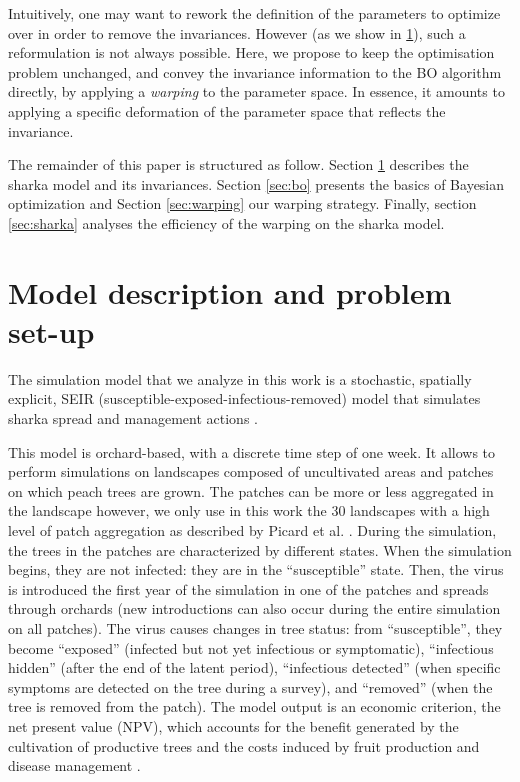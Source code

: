 Intuitively, one may want to rework the definition of the parameters to optimize over in order
to remove the invariances. However (as we show in \ref{sec:model}), such a reformulation is not always possible.
Here, we propose to keep the optimisation problem unchanged, and convey the invariance information to the BO algorithm directly, by applying 
a \textit{warping} \cite{snelson2004warped,snoek2014input} to the parameter space. In essence, it amounts to applying a specific deformation 
of the parameter space that reflects the invariance.

The remainder of this paper is structured as follow. Section \ref{sec:model} describes the sharka model and its invariances.
Section \ref{sec:bo} presents the basics of Bayesian optimization and Section \ref{sec:warping} our warping strategy. Finally, section \ref{sec:sharka}
analyses the efficiency of the warping on the sharka model.

\section{Model description and problem set-up}\label{sec:model}

The simulation model that we analyze in this work is a stochastic, spatially explicit, SEIR (susceptible-exposed-infectious-removed) model that simulates sharka spread and management actions 
\citep[including surveillance, removals and replantations][]{pleydell2018estimation,rimbaud2018using,rimbaud2018heuristic}.

This model is orchard-based, with a discrete time step of one week. It allows to perform simulations on landscapes composed of uncultivated areas and patches on which peach trees are grown. 
The patches can be more or less aggregated in the landscape however, we only use in this work the 30 landscapes with a high level of patch aggregation as described by Picard et al. \cite{picard2018}. 
During the simulation, the trees in the patches are characterized by different states. When the simulation begins, they are not infected: they are in the ``susceptible'' state. 
Then, the virus is introduced the first year of the simulation in one of the patches and spreads through orchards (new introductions can also occur during the entire simulation on all patches).
 The virus causes changes in tree status: from ``susceptible'', they become ``exposed'' (infected but not yet infectious or symptomatic), ``infectious hidden'' (after the end of the latent period), 
 ``infectious detected'' (when specific symptoms are detected on the tree during a survey), and ``removed'' (when the tree is removed from the patch). 
The model output is an economic criterion, the net present value (NPV), which accounts for the benefit generated by the cultivation of productive trees 
and the costs induced by fruit production and disease management \cite{rimbaud2018heuristic}.

